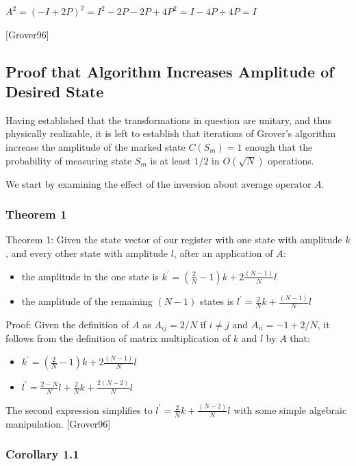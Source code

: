 \documentclass[]{article}
\begin{document}
$A^{2} = (-I+2P)^2 = I^{2} - 2P - 2P + 4P^{2} = I - 4P + 4P = I$

[Grover96]

\subsection{Proof that Algorithm Increases Amplitude of Desired State}
	
Having established that the transformations in question are unitary,
and thus physically realizable, it is left to establish that
iterations of Grover's algorithm increase the amplitude of the marked
state $C(S_{m}) = 1$ enough that the probability of measuring state
$S_{m}$ is at least $1/2$ in $O(\sqrt{N})$ operations.
	
We start by examining the effect of the inversion about average
operator $A$.

\subsubsection{Theorem 1}

Theorem 1: Given the state vector of our register with one state with
amplitude $k$, and every other state with amplitude $l$, after an
application of $A$:
\begin{itemize}
\item the amplitude in the one state is $k^{'} = \left(\frac{2}{N} - 1 \right)k + 2\frac{(N-1)}{N}l$
\item the amplitude of the remaining $(N-1)$ states is $l^{'} = \frac{2}{N}k+\frac{(N-1)}{N}l$
\end{itemize}
	
Proof: Given the definition of $A$ as $A_{ij} = 2/N$ if $i \not = j$
and $A_{ii} = -1 + 2/N$, it follows from the definition of matrix
multiplication of $k$ and $l$ by $A$ that:
\begin{itemize}
\item $k^{'} = \left(\frac{2}{N} - 1 \right)k + 2\frac{(N-1)}{N}l$
\item $l^{'} = \frac{2-N}{N}l + \frac{2}{N}k + \frac{2(N-2)}{N}l$
\end{itemize} 
The second expression simplifies to $l^{'} = \frac{2}{N}k+\frac{(N-2)}{N}l$ with some simple algebraic
manipulation. [Grover96]

\subsubsection{Corollary 1.1}
\end{document}
